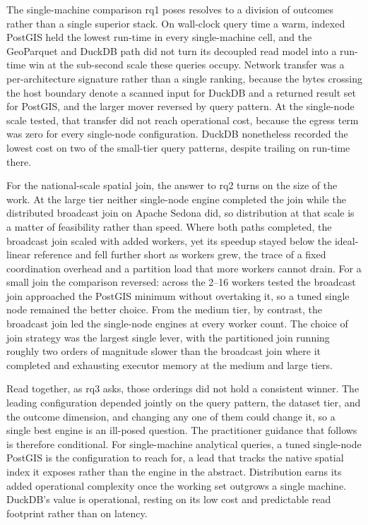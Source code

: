 The single-machine comparison \acrshort{rq}1 poses resolves to a division of outcomes rather than a single superior stack. On wall-clock query time a warm, indexed PostGIS held the lowest run-time in every single-machine cell, and the GeoParquet and DuckDB path did not turn its decoupled read model into a run-time win at the sub-second scale these queries occupy. Network transfer was a per-architecture signature rather than a single ranking, because the bytes crossing the host boundary denote a scanned input for DuckDB and a returned result set for PostGIS, and the larger mover reversed by query pattern. At the single-node scale tested, that transfer did not reach operational cost, because the egress term was zero for every single-node configuration. DuckDB nonetheless recorded the lowest cost on two of the small-tier query patterns, despite trailing on run-time there.

For the national-scale spatial join, the answer to \acrshort{rq}2 turns on the size of the work. At the large tier neither single-node engine completed the join while the distributed broadcast join on Apache Sedona did, so distribution at that scale is a matter of feasibility rather than speed. Where both paths completed, the broadcast join scaled with added workers, yet its speedup stayed below the ideal-linear reference and fell further short as workers grew, the trace of a fixed coordination overhead and a partition load that more workers cannot drain. For a small join the comparison reversed: across the 2--16 workers tested the broadcast join approached the PostGIS minimum without overtaking it, so a tuned single node remained the better choice. From the medium tier, by contrast, the broadcast join led the single-node engines at every worker count. The choice of join strategy was the largest single lever, with the partitioned join running roughly two orders of magnitude slower than the broadcast join where it completed and exhausting executor memory at the medium and large tiers.

Read together, as \acrshort{rq}3 asks, those orderings did not hold a consistent winner. The leading configuration depended jointly on the query pattern, the dataset tier, and the outcome dimension, and changing any one of them could change it, so a single best engine is an ill-posed question. The practitioner guidance that follows is therefore conditional. For single-machine analytical queries, a tuned single-node PostGIS is the configuration to reach for, a lead that tracks the native spatial index it exposes rather than the engine in the abstract. Distribution earns its added operational complexity once the working set outgrows a single machine. DuckDB's value is operational, resting on its low cost and predictable read footprint rather than on latency.

